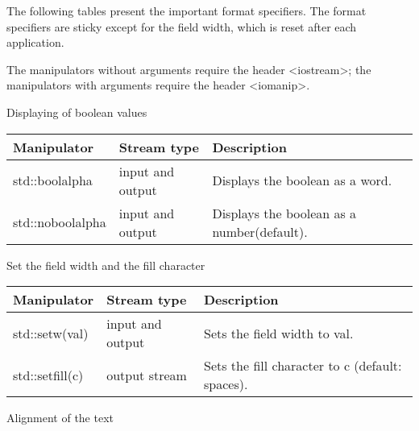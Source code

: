 The following tables present the important format specifiers. The format specifiers are sticky except for the field width, which is reset after each application.

The manipulators without arguments require the header <iostream>; the manipulators with arguments require the header <iomanip>.

\begin{center}
Displaying of boolean values
\end{center}

\begin{longtable}[c]{|l|l|l|}
\hline
\textbf{Manipulator} & \textbf{Stream type} & \textbf{Description}                       \\ \hline
\endfirsthead
%
\endhead
%
std::boolalpha       & input and output     & Displays the boolean as a word.            \\ \hline
std::noboolalpha     & input and output     & Displays the boolean as a number(default). \\ \hline
\end{longtable}

\begin{center}
Set the field width and the fill character
\end{center}

\begin{longtable}[c]{|l|l|l|}
\hline
\textbf{Manipulator} & \textbf{Stream type} & \textbf{Description}                            \\ \hline
\endfirsthead
%
\endhead
%
std::setw(val)       & input and output     & Sets the field width to val.                    \\ \hline
std::setfill(c)      & output stream        & Sets the fill character to c (default: spaces). \\ \hline
\end{longtable}



\begin{center}
Alignment of the text
\end{center}

